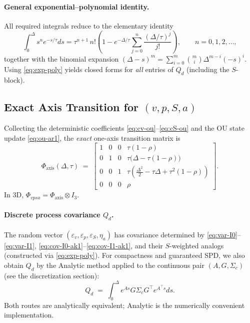\documentclass[10pt]{extarticle}
\begin{document}
\paragraph{General exponential--polynomial identity.}
All required integrals reduce to the elementary identity
\begin{equation}
\int_0^\Delta s^n e^{-s/\tau} ds
= \tau^{n+1}\,n!\left(1 - e^{-\Delta/\tau}\sum_{j=0}^{n}\frac{(\Delta/\tau)^j}{j!}\right),
\qquad n=0,1,2,\dots,
\label{eq:exp-poly}
\end{equation}
together with the binomial expansion $(\Delta-s)^m=\sum_{i=0}^m \binom{m}{i}\Delta^{m-i}(-s)^i$.
Using \eqref{eq:exp-poly} yields closed forms for \emph{all} entries of $Q_d$ (including the $S$-block).

\subsection{Exact Axis Transition for $(v,p,S,a)$}
Collecting the deterministic coefficients \eqref{eq:cv-ou}--\eqref{eq:cS-ou} and the OU state update \eqref{eq:ou-ar1},
the \emph{exact} one-axis transition matrix is
\begin{equation}
\Phi_{\text{axis}}(\Delta,\tau) \;=\;
\begin{bmatrix}
1 & 0 & 0 & \tau(1-\rho)\\
0 & 1 & 0 & \tau\big(\Delta - \tau(1-\rho)\big)\\
0 & 0 & 1 & \tau\left(\tfrac{\Delta^2}{2} - \tau\Delta + \tau^2(1-\rho)\right)\\
0 & 0 & 0 & \rho
\end{bmatrix}.
\label{eq:Phi-axis-ou}
\end{equation}
In 3D, $\Phi_{vpsa}=\Phi_{\text{axis}}\otimes I_3$.

\paragraph{Discrete process covariance $Q_d$.}
The random vector $(\varepsilon_v,\varepsilon_p,\varepsilon_S,\eta_a)$ has covariance determined by
\eqref{eq:var-I0}--\eqref{eq:var-I1}, \eqref{eq:cov-I0-ak1}--\eqref{eq:cov-I1-ak1}, and their $S$-weighted analogs
(constructed via \eqref{eq:exp-poly}). For compactness and guaranteed SPD, we also obtain $Q_d$
by the Analytic method applied to the continuous pair $(A,G,\Sigma_c)$ (see the discretization section):
\[
Q_d \;=\; \int_0^\Delta e^{A s} G \Sigma_c G^\top e^{A^\top s} ds.
\]
Both routes are analytically equivalent; Analytic is the numerically convenient implementation.
\end{document}
